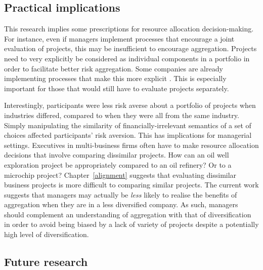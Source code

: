 \documentclass[a4paper, nobind, dvipsnames]{templates/ociamthesis}
\theoremstyle{definition}
\theoremstyle{definition}
\theoremstyle{definition}
\theoremstyle{definition}
\theoremstyle{remark}
\begin{document}
\hypertarget{practical-implications}{%
\subsection{Practical implications}\label{practical-implications}}

This research implies some prescriptions for resource allocation
decision-making. For instance, even if managers implement processes that
encourage a joint evaluation of projects, this may be insufficient to encourage
aggregation. Projects need to very explicitly be considered as individual
components in a portfolio in order to facilitate better risk aggregation. Some
companies are already implementing processes that make this more explicit
\autocite{lovallo2020}. This is especially important for those that would still have
to evaluate projects separately.

Interestingly, participants were less risk averse about a portfolio of projects
when industries differed, compared to when they were all from the same industry.
Simply manipulating the similarity of financially-irrelevant semantics of a set
of choices affected participants' risk aversion. This has implications for
managerial settings. Executives in multi-business firms often have to make
resource allocation decisions that involve comparing dissimilar projects. How
can an oil well exploration project be appropriately compared to an oil
refinery? Or to a microchip project? Chapter~\ref{alignment} suggests that
evaluating dissimilar business projects is more difficult to comparing similar
projects. The current work suggests that managers may actually be \emph{less} likely
to realise the benefits of aggregation when they are in a less diversified
company. As such, managers should complement an understanding of aggregation
with that of diversification in order to avoid being biased by a lack of variety
of projects despite a potentially high level of diversification.

\hypertarget{future-research}{%
\subsection{Future research}\label{future-research}}
\end{document}
